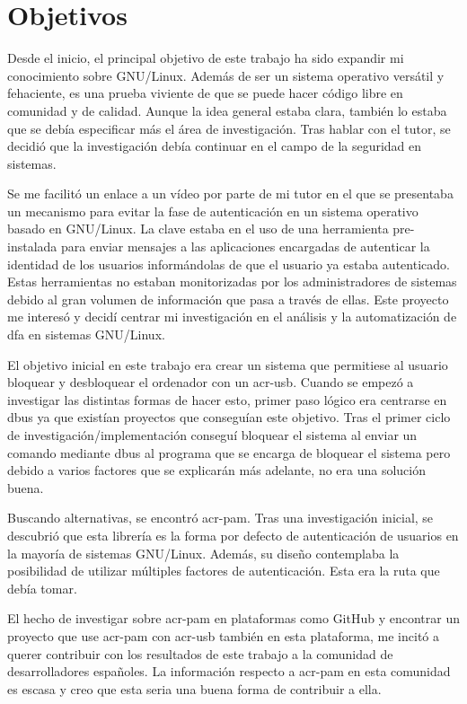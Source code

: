 \documentclass[titlepage, 12pt, a4paper]{article}
\begin{document}
\section{Objetivos}
Desde el inicio, el principal objetivo de este trabajo ha sido expandir mi conocimiento sobre \gls{GNU/Linux}. Además de ser un sistema operativo versátil y fehaciente, es una prueba viviente de que se puede hacer código libre en comunidad y de calidad. Aunque la idea general estaba clara, también lo estaba que se debía especificar más el área de investigación. Tras hablar con el tutor, se decidió que la investigación debía continuar en el campo de la seguridad en sistemas. \par
Se me facilitó un enlace a un vídeo por parte de mi tutor en el que se presentaba un mecanismo para evitar la fase de autenticación en un sistema operativo basado en \gls{GNU/Linux}. La clave estaba en el uso de una herramienta pre-instalada para enviar mensajes a las aplicaciones encargadas de autenticar la identidad de los usuarios informándolas de que el usuario ya estaba autenticado. Estas herramientas no estaban monitorizadas por los administradores de sistemas debido al gran volumen de información que pasa a través de ellas. Este proyecto me interesó y decidí centrar mi investigación en el análisis y la automatización de \gls{dfa} en sistemas \gls{GNU/Linux}. \par 
El objetivo inicial en este trabajo era crear un sistema que permitiese al usuario bloquear y desbloquear el ordenador con un \gls{acr-usb}. Cuando se empezó a investigar las distintas formas de hacer esto, primer paso lógico era centrarse en \gls{dbus} ya que existían proyectos que conseguían este objetivo. Tras el primer ciclo de investigación/implementación conseguí bloquear el sistema al enviar un comando mediante \gls{dbus} al programa que se encarga de bloquear el sistema pero debido a varios factores que se explicarán más adelante, no era una solución buena. \par 
Buscando alternativas, se encontró \gls{acr-pam}. Tras una investigación inicial, se descubrió que esta librería es la forma por defecto de autenticación de usuarios en la mayoría de sistemas \gls{GNU/Linux}. Además, su diseño contemplaba la posibilidad de utilizar múltiples factores de autenticación. Esta era la ruta que debía tomar.\par
El hecho de investigar sobre \gls{acr-pam} en plataformas como \gls{GitHub} y encontrar un proyecto que use \gls{acr-pam} con \gls{acr-usb} también en esta plataforma, me incitó a querer contribuir con los resultados de este trabajo a la comunidad de desarrolladores españoles. La información respecto a \gls{acr-pam} en esta comunidad es escasa y creo que esta seria una buena forma de contribuir a ella.\par
\end{document}

